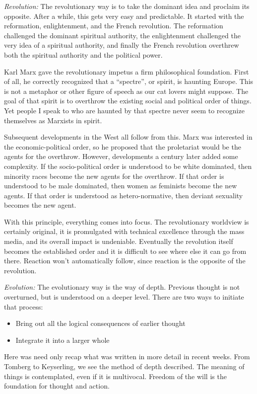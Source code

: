 \textit{Revolution:}
The revolutionary way is to take the dominant idea and proclaim its opposite. After a while, this gets very easy and predictable. It started with the reformation, enlightenment, and the French revolution. The reformation challenged the dominant spiritual authority, the enlightenment challenged the very idea of a spiritual authority, and finally the French revolution overthrew both the spiritual authority and the political power.

Karl Marx gave the revolutionary impetus a firm philosophical foundation. First of all, he correctly recognized that a “spectre”, or spirit, is haunting Europe. This is not a metaphor or other figure of speech as our cat lovers might suppose. The goal of that spirit is to overthrow the existing social and political order of things. Yet people I speak to who are haunted by that spectre never seem to recognize themselves as Marxists in spirit.

Subsequent developments in the West all follow from this. Marx was interested in the economic-political order, so he proposed that the proletariat would be the agents for the overthrow. However, developments a century later added some complexity. If the socio-political order is understood to be white dominated, then minority races become the new agents for the overthrow. If that order is understood to be male dominated, then women as feminists become the new agents. If that order is understood as hetero-normative, then deviant sexuality becomes the new agent.

With this principle, everything comes into focus. The revolutionary worldview is certainly original, it is promulgated with technical excellence through the mass media, and its overall impact is undeniable. Eventually the revolution itself becomes the established order and it is difficult to see where else it can go from there. Reaction won't automatically follow, since reaction is the opposite of the revolution.

\textit{Evolution:}
The evolutionary way is the way of depth. Previous thought is not overturned, but is understood on a deeper level. There are two ways to initiate that process:

\begin{itemize}
\item Bring out all the logical consequences of earlier thought 
\item Integrate it into a larger whole 
\end{itemize}
Here was need only recap what was written in more detail in recent weeks. From Tomberg to Keyserling, we see the method of depth described. The meaning of things is contemplated, even if it is multivocal. Freedom of the will is the foundation for thought and action.

